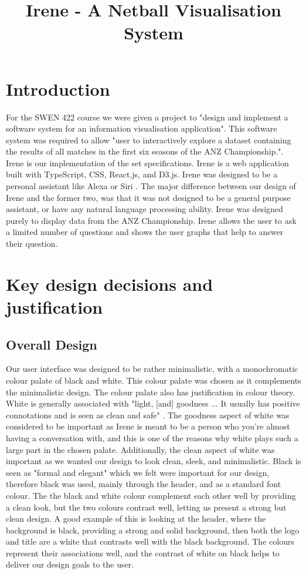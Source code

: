 \documentclass[10pt, journal]{IEEEtran}
\begin{document}
\title{Irene - A Netball Visualisation System}
\author{
}
\maketitle


\section{Introduction}
For the SWEN 422 course we were given a project to "design and implement a software system for an information visualisation application". This software system was required to allow "user to interactively explore a dataset containing the results of all matches in the first six seasons of the ANZ Championship.". Irene \cite{irene} is our implementation of the set specifications. Irene is a web application built with TypeScript, CSS, React.js, and D3.js. Irene was designed to be a personal assistant like Alexa \cite{alexa} or Siri \cite{siri}. The major difference between our design of Irene and the former two, was that it was not designed to be a general purpose assistant, or have any natural language processing ability. Irene was designed purely to display data from the ANZ Championship. Irene allows the user to ask a limited number of questions and shows the user graphs that help to answer their question. 


\section{Key design decisions and justification}

\subsection{Overall Design}
Our user interface was designed to be rather minimalistic, with a monochromatic colour palate of black and white. This colour palate was chosen as it complements the minimalistic design. The colour palate also has justification in colour theory. White is generally associated with "light, [and] goodness ... It usually has positive connotations and is seen as clean and safe" \cite{color}. The goodness aspect of white was considered to be important as Irene is meant to be a person who you're almost having a conversation with, and this is one of the reasons why white plays such a large part in the chosen palate. Additionally, the clean aspect of white was important as we wanted our design to look clean, sleek, and minimalistic.  Black is seen as "formal and elegant" which we felt were important for our design, therefore black was used, mainly through the header, and as a standard font colour. The the black and white colour complement each other well by providing a clean look, but the two colours contrast well, letting us present a strong but clean design. A good example of this is looking at the header, where the background is black, providing a strong and solid background, then both the logo and title are a white that contrasts well with the black background. The colours represent their associations well, and the contrast of white on black helps to deliver our design goals to the user. 
\end{document}
